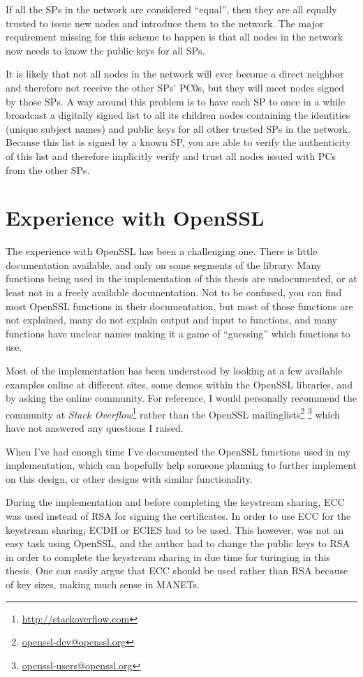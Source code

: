 If all the \acp{SP} in the network are considered ``equal'', then they are all
equally trusted to issue new nodes and introduce them to the network. The major
requirement missing for this scheme to happen is that all nodes in the network
now needs to know the public keys for all SPs.

It is likely that not all nodes in the network will ever become a direct
neighbor and therefore not receive the other SPs' \acp{PC0}, but they will meet
nodes signed by those SPs. A way around this problem is to have each \ac{SP} to
once in a while broadcast a digitally signed list to all its children nodes
containing the identities (unique subject names) and public keys for all other
trusted \acp{SP} in the network. Because this list is signed by a known
\ac{SP}, you are able to verify the authenticity of this list and therefore
implicitly verify and trust all nodes issued with PCs from the other SPs.

\section{Experience with OpenSSL}
The experience with OpenSSL has been a challenging one. There is little
documentation available, and only on some segments of the library. Many
functions being used in the implementation of this thesis are undocumented, or
at least not in a freely available documentation. Not to be confused, you can
find most OpenSSL functions in their documentation, but most of those functions
are not explained, many do not explain output and input to functions, and many
functions have unclear names making it a game of ``guessing'' which functions to
use.

Most of the implementation has been understood by looking at a few available
examples online at different sites, some demos within the OpenSSL libraries,
and by asking the online community. For reference, I would personally recommend the
community at \emph{Stack Overflow}\footnote{\url{http://stackoverflow.com}}
rather than the OpenSSL mailinglists\footnote{\url{openssl-dev@openssl.org}}
\footnote{\url{openssl-users@openssl.org}} which have not answered any
questions I raised.

When I've had enough time I've documented the OpenSSL functions used in my
implementation, which can hopefully help someone planning to further implement
on this design, or other designs with similar functionality.

During the implementation and before completing the keystream sharing, ECC was
used instead of RSA for signing the certificates. In order to use ECC for the
keystream sharing, ECDH or ECIES had to be used. This however, was not an easy
task using OpenSSL, and the author had to change the public keys to RSA in order
to complete the keystream sharing in due time for turinging in this thesis. One
can easily argue that ECC should be used rather than RSA because of key sizes,
making much sense in \acp{MANET}.

